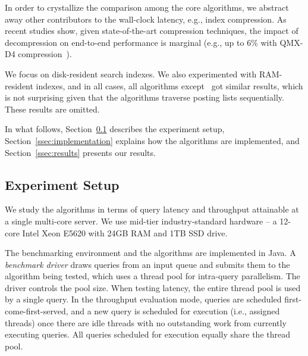 {
In order to crystallize the comparison among  the core algorithms, 
we abstract away other contributors to the wall-clock  latency, e.g., index compression. 
As recent studies show, given state-of-the-art compression techniques, the impact 
of decompression on end-to-end performance is marginal (e.g., up to $6\%$ with QMX-D4 compression~\cite{Lin:2017}).  

We focus on disk-resident search indexes. 
We also experimented with RAM-resident indexes, and in all cases, all algorithms except \pRA\ got similar results, which is not surprising given that the algorithms traverse posting lists sequentially. These results are omitted.

In what follows, Section~\ref{ssec:setup} describes the experiment setup, 
Section~\ref{ssec:implementation} explains how the algorithms are 
implemented, and Section~\ref{ssec:results} presents our results.


\subsection{Experiment Setup}
\label{ssec:setup}

We study the algorithms in terms of query latency and throughput attainable at a single multi-core server. 
We use mid-tier industry-standard hardware -- a 12-core Intel Xeon E5620 with 24GB RAM and 1TB SSD drive. 

The benchmarking environment and the algorithms  are implemented in Java. 
A  \emph{benchmark driver} draws queries from an input queue and submits them to the algorithm being tested, which
uses a thread pool for intra-query parallelism. 
The driver controls the pool size. %
When testing latency, the entire thread pool is used by a single query. 
In the throughput evaluation mode, queries are scheduled first-come-first-served, 
and a new query is scheduled for execution (i.e., assigned threads) 
once  there are idle threads with no outstanding work from currently executing queries.
All queries scheduled for execution equally share the thread pool.

}
